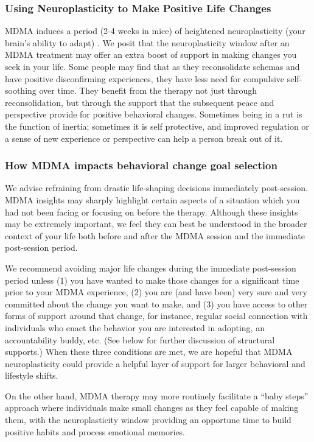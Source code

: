 \documentclass[12pt,letterpaper]{article}
\begin{document}
\subsubsection{Using Neuroplasticity to Make Positive Life Changes}
MDMA induces a period (2-4 weeks in mice) of heightened neuroplasticity (your brain's ability to adapt) \cite{nardouMDMAPlasticity}. We posit that the neuroplasticity window after an MDMA treatment may offer an extra boost of support in making changes you seek in your life. Some people may find that as they reconsolidate schemas and have positive disconfirming experiences, they have less need for compulsive self-soothing over time. They benefit from the therapy not just through reconsolidation, but through the support that the subsequent peace and perspective provide for positive behavioral changes. Sometimes being in a rut is the function of inertia; sometimes it is self protective, and improved regulation or a sense of new experience or perspective can help a person break out of it.

\subsubsection*{How MDMA impacts behavioral change goal selection}

We advise refraining from drastic life-shaping decisions immediately post-session. MDMA insights may sharply highlight certain aspects of a situation which you had not been facing or focusing on before the therapy. Although these insights may be extremely important, we feel they can best be understood in the broader context of your life both before and after the MDMA session and the immediate post-session period.

We recommend avoiding major life changes during the immediate post-session period unless (1) you have wanted to make those changes for a significant time prior to your MDMA experience, (2) you are (and have been) very sure and very committed about the change you want to make, and (3) you have access to other forms of support around that change, for instance, regular social connection with individuals who enact the behavior you are interested in adopting, an accountability buddy, etc. (See below for further discussion of structural supports.)  When these three conditions are met, we are hopeful that MDMA neuroplasticity could provide a helpful layer of support for larger behavioral and lifestyle shifts.

On the other hand, MDMA therapy may more routinely facilitate a “baby steps” approach where individuals make small changes as they feel capable of making them, with the neuroplasticity window providing an opportune time to build positive habits and process emotional memories.
\end{document}
